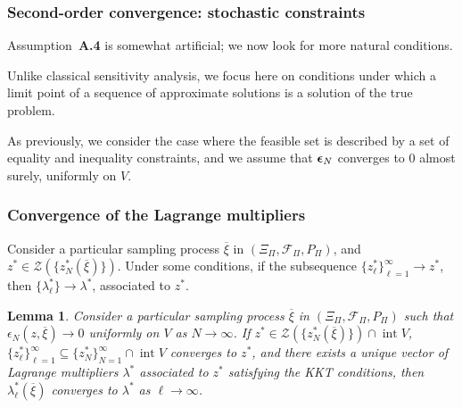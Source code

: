 \documentclass[aspectratio=169]{beamer}
\newtheorem{lem}{Lemma}
\begin{document}
\begin{frame}
\frametitle{Second-order convergence: stochastic constraints}

Assumption~\textbf{A.4} is somewhat artificial; we now look for more natural conditions.

\mbox{}

Unlike classical sensitivity analysis, we focus here on conditions under which a limit point of a sequence of approximate solutions is a solution of the true problem.

\mbox{}

As previously, we consider the case where the feasible set is described by a set of equality and inequality constraints, and we assume that ${\boldsymbol{\epsilon}}_N$ converges to 0 almost surely, uniformly on $V$.

\end{frame}

\begin{frame}
\frametitle{Convergence of the Lagrange multipliers}

Consider a particular sampling process $\overline{\xi}$ in $(\Xi_{\Pi}, \mathcal{F}_{\Pi}, P_{\Pi})$, and $z^*
\in \mathcal{Z}\left(\lbrace z^*_N(\overline{\xi})\rbrace\right)$.
Under some conditions, if the subsequence $\lbrace z_{\ell}^* \rbrace_{\ell =  1}^{\infty} \rightarrow z^*$, then %
$\lbrace \lambda_{\ell}^* \rbrace %
\rightarrow \lambda^*$, associated to $z^*$. %

\mbox{}

\begin{lem}
Consider a particular sampling process
$\overline{\xi}$ in $(\Xi_{\Pi}, \mathcal{F}_{\Pi}, P_{\Pi})$ such that
$\epsilon_N \left( z, \overline{\xi} \right) \rightarrow 0$
uniformly on $V$ as $N \rightarrow \infty$.
If $z^* \in \mathcal{Z} \left(\lbrace
z^*_N(\overline{\xi})\rbrace\right) \cap \operatorname{int} V$, $\lbrace
z_{\ell}^* \rbrace_{\ell =  1}^{\infty} \subseteq \lbrace z_N^*
\rbrace_{N = 1}^{\infty} \cap \operatorname{int} V$ converges to $z^*$,
and there exists a unique vector of Lagrange multipliers $\lambda^*$ associated to $z^*$ satisfying the KKT conditions, then $\lambda^*_{\ell}(\overline{\xi})$ converges to $\lambda^*$ as $\ell \rightarrow \infty$.
\end{lem}

\end{frame}
\end{document}

